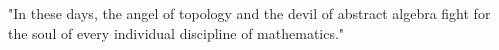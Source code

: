 \documentclass[preview]{standalone}
\begin{document}
\begin{center}
"In these days, the angel of topology and the devil of abstract algebra   fight for the soul of every individual discipline of mathematics."
\end{center}
\end{document}
